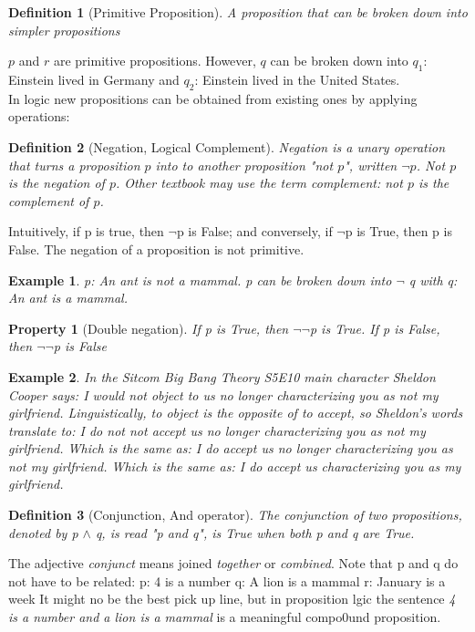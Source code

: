 \documentclass[10pt,a4paper,draft,titlepage,onecolumn]{book}
\newtheorem{definition}{Definition}[section]
\newtheorem{example}{Example}[section]
\newtheorem{property}{Property}[section]
\begin{document}
\begin{definition}[Primitive Proposition]
A proposition that can be broken down into simpler propositions
\end{definition}
$p$ and $r$ are primitive propositions. However, $q$ can be broken down into $q_1$: Einstein lived in Germany and $q_2$: Einstein lived in the United States. \\

In logic new propositions can be obtained from existing ones by applying operations: 
\begin{definition}[Negation, Logical Complement] Negation is a unary operation that turns a proposition $p$ into to another proposition "not $p$", written {$\neg$}$p$. Not $p$ is the negation of $p$. Other textbook may use the term complement: not $p$ is the complement of $p$.
\end{definition} 

Intuitively, if p is true, then $\neg$p is False; and conversely, if $\neg$p is True, then p is False.
The negation of a proposition is not primitive. 
\begin{example}
p: An ant is not a mammal. 
p can be broken down into $\neg$ q with q: An ant is a mammal.
\end{example}

\begin{property}[Double negation] If p is True, then {$\neg$}{$\neg$}p is True. If p is False, then {$\neg$}$\neg$p is False
\end{property}
\begin{example}
In the Sitcom Big Bang Theory S5E10 main character Sheldon Cooper says: I would not object to us no longer characterizing you as not my girlfriend. Linguistically, to object is the opposite of to accept, so Sheldon's words translate to: I do not not accept us no longer characterizing you as not my girlfriend. 
Which is the same as: I do accept us no longer characterizing you as not my girlfriend. 
Which is the same as: I do accept us characterizing you as my girlfriend. 
\end{example}

\begin{definition}[Conjunction, And operator] The conjunction of two propositions, denoted by p $\wedge$ q, is read "p and q", is True when both p and q are True.
\end{definition} 
The adjective \textit{conjunct} means joined \textit{together} or \textit{combined}.
Note that p and q do not have to be related:
p: 4 is a number
q: A lion is a mammal 
r: January is a week
It might no be the best pick up line, but in proposition lgic the sentence \textit{4 is a number and a lion is a mammal} is a meaningful compo0und proposition.
\end{document}

